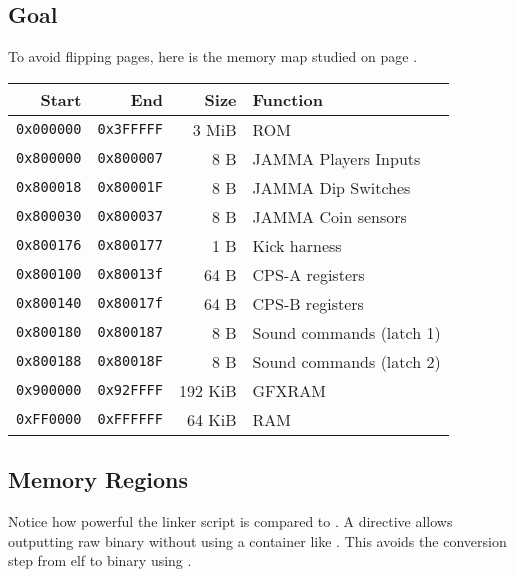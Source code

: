\pagebreak

\subsection{Goal}
To avoid flipping pages, here is the memory map studied on page \pageref{m68k_mm}.

\begin{tabularx}{\textwidth}{rrrX}
\toprule    
  \textbf{Start } & \textbf{End  } & \textbf{Size } & \textbf{Function } \\               
  \toprule    
  \texttt{0x000000} & \texttt{0x3FFFFF} & 3 MiB & ROM \\
  \toprule    
  \texttt{0x800000} & \texttt{0x800007} & 8 B & JAMMA Players Inputs \\
  \texttt{0x800018} & \texttt{0x80001F} & 8 B & JAMMA Dip Switches \\
  \texttt{0x800030} & \texttt{0x800037} & 8 B & JAMMA Coin sensors \\
  \texttt{0x800176} & \texttt{0x800177} & 1 B & Kick harness \\
\toprule    
  \texttt{0x800100} & \texttt{0x80013f} & 64 B & CPS-A registers\\
  \texttt{0x800140} & \texttt{0x80017f} & 64 B & CPS-B registers\\
\toprule    
  \texttt{0x800180} & \texttt{0x800187} & 8 B & Sound commands (latch 1)\\
  \texttt{0x800188} & \texttt{0x80018F} & 8 B & Sound commands (latch 2)\\
  \toprule    
  \texttt{0x900000} & \texttt{0x92FFFF} & 192 KiB & GFXRAM\\
  \texttt{0xFF0000} & \texttt{0xFFFFFF} & 64 KiB & RAM \\
  \toprule    
\end{tabularx}%

\subsection{Memory Regions}



\begin{trivia}
Notice how powerful the linker script is compared to . A directive  allows outputting raw binary without using a container like . This avoids the conversion step from elf to binary using .
\end{trivia}


